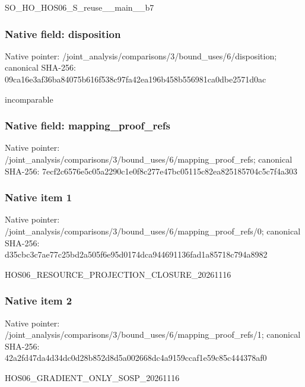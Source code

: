 \documentclass[10pt,a4paper]{article}
\begin{document}
\begingroup\raggedright\sloppy SO\_\allowbreak{}HO\_\allowbreak{}HOS06\_\allowbreak{}S\_\allowbreak{}reuse\_\allowbreak{}\_\allowbreak{}main\_\allowbreak{}\_\allowbreak{}b7\par\endgroup

\subsubsection{Native field: disposition}
Native pointer: /joint\_\allowbreak{}analysis/comparisons/3/bound\_\allowbreak{}uses/6/disposition; canonical SHA-256: 09ca16e3af36ba84075b616f538c97fa42ea196b458b556981ca0dbe2571d0ac

\begingroup\raggedright\sloppy incomparable\par\endgroup

\subsubsection{Native field: mapping\_\allowbreak{}proof\_\allowbreak{}refs}
Native pointer: /joint\_\allowbreak{}analysis/comparisons/3/bound\_\allowbreak{}uses/6/mapping\_\allowbreak{}proof\_\allowbreak{}refs; canonical SHA-256: 7ecf2c6576e5c05a2290c1e0f8c277e47bc05115c82ea825185704c5c7f4a303

\subsubsection{Native item 1}
Native pointer: /joint\_\allowbreak{}analysis/comparisons/3/bound\_\allowbreak{}uses/6/mapping\_\allowbreak{}proof\_\allowbreak{}refs/0; canonical SHA-256: d35cbc3c7ae77c25bd2a505f6e95d0174dca944691136fad1a85718c794a8982

\begingroup\raggedright\sloppy HOS06\_\allowbreak{}RESOURCE\_\allowbreak{}PROJECTION\_\allowbreak{}CLOSURE\_\allowbreak{}20261116\par\endgroup

\subsubsection{Native item 2}
Native pointer: /joint\_\allowbreak{}analysis/comparisons/3/bound\_\allowbreak{}uses/6/mapping\_\allowbreak{}proof\_\allowbreak{}refs/1; canonical SHA-256: 42a2fd47da4d34dc0d28b852d8d5a002668dc4a9159ccaf1e59c85c444378af0

\begingroup\raggedright\sloppy HOS06\_\allowbreak{}GRADIENT\_\allowbreak{}ONLY\_\allowbreak{}SOSP\_\allowbreak{}20261116\par\endgroup
\end{document}

